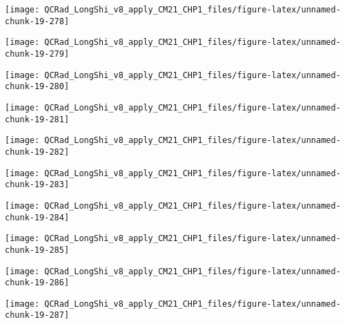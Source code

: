 \documentclass[
  10pt,
  a4paper,oneside]{article}
\begin{document}
\begin{center}\texttt{[image: QCRad\_LongShi\_v8\_apply\_CM21\_CHP1\_files/figure-latex/unnamed-chunk-19-278]} \end{center}

\begin{center}\texttt{[image: QCRad\_LongShi\_v8\_apply\_CM21\_CHP1\_files/figure-latex/unnamed-chunk-19-279]} \end{center}

\begin{center}\texttt{[image: QCRad\_LongShi\_v8\_apply\_CM21\_CHP1\_files/figure-latex/unnamed-chunk-19-280]} \end{center}

\begin{center}\texttt{[image: QCRad\_LongShi\_v8\_apply\_CM21\_CHP1\_files/figure-latex/unnamed-chunk-19-281]} \end{center}

\begin{center}\texttt{[image: QCRad\_LongShi\_v8\_apply\_CM21\_CHP1\_files/figure-latex/unnamed-chunk-19-282]} \end{center}

\begin{center}\texttt{[image: QCRad\_LongShi\_v8\_apply\_CM21\_CHP1\_files/figure-latex/unnamed-chunk-19-283]} \end{center}

\begin{center}\texttt{[image: QCRad\_LongShi\_v8\_apply\_CM21\_CHP1\_files/figure-latex/unnamed-chunk-19-284]} \end{center}

\begin{center}\texttt{[image: QCRad\_LongShi\_v8\_apply\_CM21\_CHP1\_files/figure-latex/unnamed-chunk-19-285]} \end{center}

\begin{center}\texttt{[image: QCRad\_LongShi\_v8\_apply\_CM21\_CHP1\_files/figure-latex/unnamed-chunk-19-286]} \end{center}

\begin{center}\texttt{[image: QCRad\_LongShi\_v8\_apply\_CM21\_CHP1\_files/figure-latex/unnamed-chunk-19-287]} \end{center}
\end{document}
